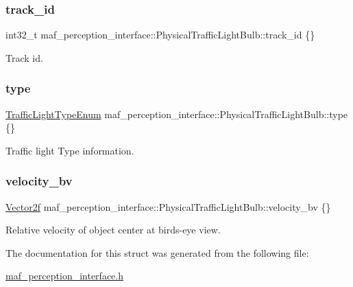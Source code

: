 \subsubsection{\texorpdfstring{track\+\_\+id}{track\_id}}
{\footnotesize\ttfamily int32\+\_\+t maf\+\_\+perception\+\_\+interface\+::\+Physical\+Traffic\+Light\+Bulb\+::track\+\_\+id \{\}}



Track id. 

\mbox{\label{structmaf__perception__interface_1_1PhysicalTrafficLightBulb_a66b84c7b91778e0e411f6388b66eaa03}} 
\subsubsection{\texorpdfstring{type}{type}}
{\footnotesize\ttfamily \hyperlink{structmaf__perception__interface_1_1TrafficLightTypeEnum}{Traffic\+Light\+Type\+Enum} maf\+\_\+perception\+\_\+interface\+::\+Physical\+Traffic\+Light\+Bulb\+::type \{\}}



Traffic light Type information. 

\mbox{\label{structmaf__perception__interface_1_1PhysicalTrafficLightBulb_a7968efa5a362fa7815c637cab06b2dff}} 
\subsubsection{\texorpdfstring{velocity\+\_\+bv}{velocity\_bv}}
{\footnotesize\ttfamily \hyperlink{structmaf__perception__interface_1_1Vector2f}{Vector2f} maf\+\_\+perception\+\_\+interface\+::\+Physical\+Traffic\+Light\+Bulb\+::velocity\+\_\+bv \{\}}



Relative velocity of object center at bird\textquotesingle{}s-\/eye view. 



The documentation for this struct was generated from the following file\+:\begin{DoxyCompactItemize}
\item 
\hyperlink{maf__perception__interface_8h}{maf\+\_\+perception\+\_\+interface.\+h}\end{DoxyCompactItemize}
